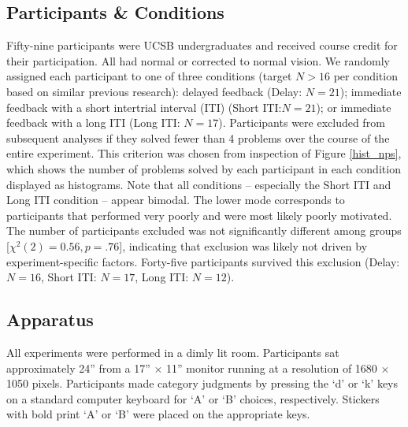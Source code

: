 \documentclass[jou,apacite]{apa6}
\begin{document}
\subsection{Participants \& Conditions}
Fifty-nine participants were UCSB undergraduates and received course credit for
their participation. All had normal or corrected to normal vision. We randomly
assigned each participant to one of three conditions (target $N>16$ per
condition based on similar previous research): delayed feedback (Delay: $N =
21$); immediate feedback with a short intertrial interval (ITI) (Short ITI:$ N =
21$); or immediate feedback with a long ITI (Long ITI: $N = 17$). Participants
were excluded from subsequent analyses if they solved fewer than 4 problems over
the course of the entire experiment. This criterion was chosen from inspection
of Figure \ref{hist_nps}, which shows the number of problems solved by each
participant in each condition displayed as histograms. Note that all conditions
-- especially the Short ITI and Long ITI condition -- appear bimodal. The lower
mode corresponds to participants that performed very poorly and were most likely
poorly motivated. The number of participants excluded was not significantly
different among groups [$\chi^2(2) = 0.56, p =.76$], indicating that exclusion
was likely not driven by experiment-specific factors. Forty-five participants
survived this exclusion (Delay: $N = 16$, Short ITI: $N = 17$, Long ITI: $N =
12$).

\subsection{Apparatus}
All experiments were performed in a dimly lit room. Participants sat
approximately 24'' from a 17'' $\times$ 11'' monitor running at a resolution of
1680 $\times$ 1050 pixels. Participants made category judgments by pressing the
`d' or `k' keys on a standard computer keyboard for `A' or `B' choices,
respectively. Stickers with bold print `A' or `B' were placed on the appropriate
keys.
\end{document}
